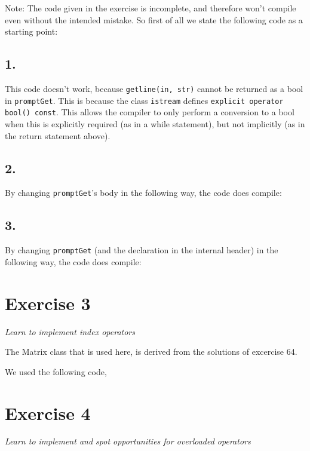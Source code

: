 \documentclass[12pt]{article}
\newcommand{\desc}[1]{\textit{#1} \vspace{1em}}
\begin{document}
Note: The code given in the exercise is incomplete, and therefore won't compile even without the intended mistake. So first of all we state the following code as a starting point:






\subsection*{1.}
This code doesn't work, because \texttt{getline(in, str)} cannot be returned as a bool in \texttt{promptGet}. This is because the class \texttt{istream} defines \texttt{explicit operator bool() const}. This allows the compiler to only perform a conversion to a bool when this is explicitly required (as in a while statement), but not implicitly (as in the return statement above).

\subsection*{2.}
By changing \texttt{promptGet}'s body in the following way, the code does compile:


\subsection*{3.}
By changing \texttt{promptGet} (and the declaration in the internal header) in the following way, the code does compile:





\clearpage
\section*{Exercise 3}
\desc{Learn to implement index operators}

The Matrix class that is used here, is derived from the solutions of excercise 64.

We used the following code,


\clearpage
\section*{Exercise 4}
\desc{Learn to implement and spot opportunities for overloaded operators}
\end{document}
